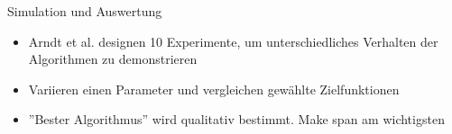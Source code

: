 \documentclass[aspectratio=169,10pt]{beamer}
\begin{document}

\begin{frame}[t, fragile]{Simulation und Auswertung}
	\begin{itemize}
		\item Arndt et al. \alert{designen 10 Experimente}, um unterschiedliches Verhalten der Algorithmen zu demonstrieren
		\item Variieren einen Parameter und vergleichen gew\"ahlte Zielfunktionen
		\item ''Bester Algorithmus'' wird \alert{qualitativ} bestimmt. Make span am wichtigsten
	\end{itemize}
\end{frame}
\end{document}
